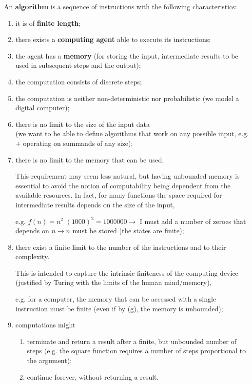 An \textbf{algorithm} is a sequence of instructions with the following characteristics:
\begin{enumerate}[label=\alph*)]
\item
  \label{as:prog_fin}
  it is of \textbf{finite length};
\item there exists a \textbf{computing agent} able to execute its instructions;
\item the agent has a \textbf{memory} (for storing the input, intermediate results to be used in subsequent steps and the output);
\item the computation consists of discrete steps;
\item the computation is neither non-deterministic nor probabilistic (we model a digital computer);

\item there is no limit to the size of the input data\\
  (we want to be able to define algorithms that work on any possible
  input, e.g. $+$ operating on summands of any size);

\item there is no limit to the memory that can be used.
  
  This requirement may seem less natural, but having unbounded memory
  is essential to avoid the notion of computability being dependent
  from the available resources. In fact, for many functions the space
  required for intermediate results depends on the size of the input,

  e.g. $f(n) = n^2$ $(1000)^2 = 1000000 \rightarrow$ I must add a
  number of zeroes that depends on $n \rightarrow n$ must be stored
  (the states are finite);

\item
  \label{as:istr_fin}
  there exist a finite limit to the number of the
  instructions and to their complexity.

  This is intended to capture the intrinsic finiteness of the
  computing device (justified by Turing with the limits of the human
  mind/memory),

  e.g. for a computer, the memory that can be accessed with a single
  instruction must be finite (even if by (g), the memory is unbounded);

\item computations might
  \begin{enumerate}

  \item  terminate and return a result after a finite, but unbounded number of steps
    (e.g. the square function requires a number of steps proportional to the argument);

  \item continue forever, without returning a result.
  \end{enumerate}
\end{enumerate}

